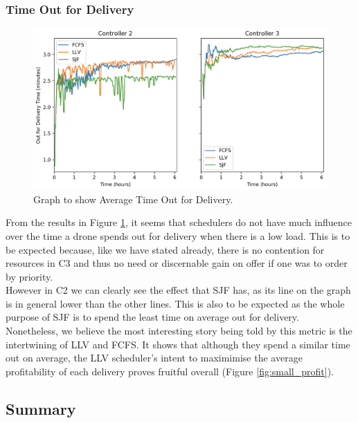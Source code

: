 \documentclass[a4paper,11pt,titlepage]{report}
\begin{document}
\subsubsection{Time Out for Delivery}
\begin{figure}[!hbpt]
  \center
  \includegraphics[width=0.95\linewidth]{img/small/deltime.png}
  \caption{Graph to show Average Time Out for Delivery.}
  \label{fig:small_deltime}
\end{figure}

\clearpage
From the results in Figure \ref{fig:small_deltime}, it seems that schedulers do not have much influence over the time a drone spends out for delivery when there is a low load. This is to be expected because, like we have stated already, there is no contention for resources in C3 and thus no need or discernable gain on offer if one was to order by priority.\\

However in C2 we can clearly see the effect that SJF has, as its line on the graph is in general lower than the other lines. This is also to be expected as the whole purpose of SJF is to spend the least time on average out for delivery.\\

Nonetheless, we believe the most interesting story being told by this metric is the intertwining of LLV and FCFS. It shows that although they spend a similar time out on average, the LLV scheduler's intent to maximimise the average profitability of each delivery proves fruitful overall (Figure \ref{fig:small_profit}).

\subsection{Summary}


\end{document}
